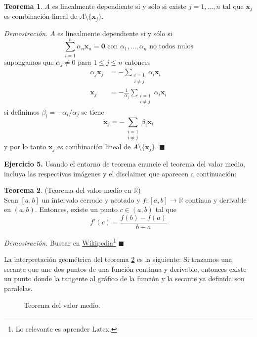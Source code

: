 \documentclass[oneside,spanish]{article}
\theoremstyle{definition}
\newtheorem{teorema}{Teorema}
\theoremstyle{definition}\newtheorem{definicion}{Definición}
\theoremstyle{definition}\newtheorem{ejemplo}{Ejemplo}
\theoremstyle{remark}\newtheorem{nota}{\textsc{Nota}}
\theoremstyle{definition}\newtheorem{proposicion}{Proposición}
\theoremstyle{definition}\newtheorem{problema}{Problema}
\newcommand{\halmos}{\hspace*{\fill}$\blacksquare$}
\newenvironment{demostracion}{\textit{Demostraci\'{o}n.}}{\halmos}
\newcommand{\R}{\mathbb{R}}
\renewcommand{\vec}[1]{\boldsymbol{#1}}
\begin{document}
\begin{teorema}
$A$ es linealmente dependiente si y s\'olo si existe $j=1,\ldots,n$ tal que $\vec{x}_j$ es combinaci\'on lineal de $A\setminus \{\vec{x}_j\}$.
\end{teorema}

\begin{demostracion}
$A$ es linealmente dependiente si y s\'olo si
$$\sum_{i=1}^n \alpha_n \vec{x}_n = \vec{0} \text{ con } \alpha_1,\ldots,\alpha_n \text{ no todos nulos}$$
supongamos que $\alpha_j \neq 0$ para $1\leq j \leq n$ entonces
\begin{align*}
\alpha_j \vec{x}_j &= -\sum_{\substack{i=1\\i\neq j}} \alpha_i \vec{x}_i \\
\vec{x}_j &= -\frac{1}{\alpha_j}\sum_{\substack{i=1\\i\neq j}} \alpha_i \vec{x}_i 
\end{align*}
si definimos $\beta_i = -\alpha_i / \alpha_j$ se tiene
$$\vec{x}_j = -\sum_{\substack{i=1\\i\neq j}} \beta_i \vec{x}_i $$
y por lo tanto $\vec{x}_j$ es combinaci\'on lineal de $A\setminus \{\vec{x}_j\}$.
\end{demostracion}

\textbf{Ejercicio 5.} Usando el entorno de teorema enuncie el teorema del valor medio, incluya las respectivas im\'agenes y el disclaimer que aparecen a continuaci\'on:

\begin{teorema}{\rm (Teorema del valor medio en $\R$)\index{Teorema!del valor medio en $\R$}}\label{valormedioenr}
\\Sean $[a,b]$ un intervalo cerrado y acotado y $f:[a,b]\rightarrow \R$ continua y derivable en $(a,b)$. Entonces, existe un punto $c \in (a,b)$ tal que
$$f'(c)=\frac{f(b)-f(a)}{b-a}$$
\end{teorema}

\begin{demostracion}
Buscar en \href{http://es.wikipedia.org}{Wikipedia}\footnote{Lo relevante es aprender Latex.}
\end{demostracion}

La interpretaci\'on geom\'etrica del teorema \ref{valormedioenr} es la siguiente: Si trazamos una secante que une dos puntos de una funci\'on continua y derivable, entonces
existe un punto donde la tangente al gr\'afico de la funci\'on y la secante ya definida son paralelas.
\begin{figure}[h]
	\centering
	
	\caption{Teorema del valor medio.}
\end{figure}
\end{document}
